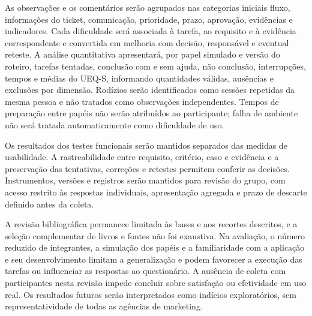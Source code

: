 As observações e os comentários serão agrupados nas categorias iniciais fluxo, informações do ticket, comunicação, prioridade, prazo, aprovação, evidências e indicadores. Cada dificuldade será associada à tarefa, ao requisito e à evidência correspondente e convertida em melhoria com decisão, responsável e eventual reteste. A análise quantitativa apresentará, por papel simulado e versão do roteiro, tarefas tentadas, conclusão com e sem ajuda, não conclusão, interrupções, tempos e médias do UEQ-S, informando quantidades válidas, ausências e exclusões por dimensão. Rodízios serão identificados como sessões repetidas da mesma pessoa e não tratados como observações independentes. Tempos de preparação entre papéis não serão atribuídos ao participante; falha de ambiente não será tratada automaticamente como dificuldade de uso.

Os resultados dos testes funcionais serão mantidos separados das medidas de usabilidade. A rastreabilidade entre requisito, critério, caso e evidência e a preservação das tentativas, correções e retestes permitem conferir as decisões. Instrumentos, versões e registros serão mantidos para revisão do grupo, com acesso restrito às respostas individuais, apresentação agregada e prazo de descarte definido antes da coleta.

A revisão bibliográfica permanece limitada às bases e aos recortes descritos, e a seleção complementar de livros e fontes não foi exaustiva. Na avaliação, o número reduzido de integrantes, a simulação dos papéis e a familiaridade com a aplicação e seu desenvolvimento limitam a generalização e podem favorecer a execução das tarefas ou influenciar as respostas ao questionário. A ausência de coleta com participantes nesta revisão impede concluir sobre satisfação ou efetividade em uso real. Os resultados futuros serão interpretados como indícios exploratórios, sem representatividade de todas as agências de marketing.
